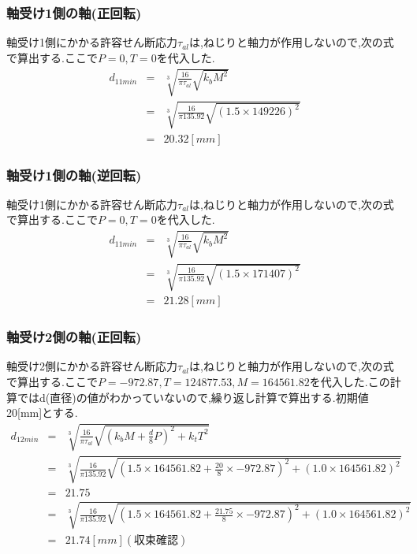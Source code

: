\subsubsection{軸受け1側の軸(正回転)}
軸受け1側にかかる許容せん断応力$\tau_{al}$は,ねじりと軸力が作用しないので,次の式で算出する.ここで$P=0,T=0$を代入した.
\begin{eqnarray}
d_{11min} &=& \sqrt [3]{ \frac{16}{\pi \tau_{al}}\sqrt{k_bM^2} }\\
       &=& \sqrt [3]{ \frac{16}{\pi 135.92}\sqrt{(1.5 \times 149226)^2} }\\
       &=& 20.32[mm]
\end{eqnarray}
\subsubsection{軸受け1側の軸(逆回転)}
軸受け1側にかかる許容せん断応力$\tau_{al}$は,ねじりと軸力が作用しないので,次の式で算出する.ここで$P=0,T=0$を代入した.
\begin{eqnarray}
d_{11min} &=& \sqrt [3]{ \frac{16}{\pi \tau_{al}}\sqrt{k_bM^2} }\\
       &=& \sqrt [3]{ \frac{16}{\pi 135.92}\sqrt{(1.5 \times 171407)^2} }\\
       &=& 21.28[mm]
\end{eqnarray}
\subsubsection{軸受け2側の軸(正回転)}
軸受け2側にかかる許容せん断応力$\tau_{al}$は,ねじりと軸力が作用しないので,次の式で算出する.ここで$P=-972.87,T=124877.53, M=164561.82$を代入した.この計算ではd(直径)の値がわかっていないので,繰り返し計算で算出する.初期値20[mm]とする.
\begin{eqnarray}
d_{12min}&=& \sqrt [3]{ \frac{16}{\pi \tau_{al}}\sqrt{(k_bM+\frac{d}{8}P)^2+k_tT^2} }\\
       &=& \sqrt [3]{ \frac{16}{\pi 135.92} \sqrt{(1.5 \times 164561.82 +\frac{20}{8}\times -972.87)^2+(1.0 \times 164561.82)^2} }\\
       &=&21.75\\
       &=& \sqrt [3]{ \frac{16}{\pi 135.92} \sqrt{(1.5 \times 164561.82 +\frac{21.75}{8}\times -972.87)^2+(1.0 \times 164561.82)^2} }\\
       &=&21.74[mm](収束確認)
\end{eqnarray}


